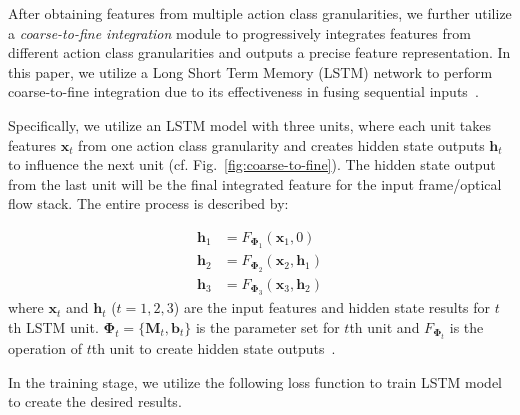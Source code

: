 \documentclass[letterpaper]{article}
\begin{document}
After obtaining features from multiple action class granularities, we further utilize a \emph{coarse-to-fine integration} module to progressively integrates features from different action class granularities and outputs a precise feature representation. In this paper, we utilize a Long Short Term Memory (LSTM) network to perform coarse-to-fine integration due to its effectiveness in fusing sequential inputs~\cite{LSTM,LSTM2}.



Specifically, we utilize an LSTM model with three units, where each unit takes features $\mathbf{x}_{t}$ from one action class granularity and creates hidden state outputs $\mathbf{h}_{t}$ to influence the next unit (cf. Fig.~\ref{fig:coarse-to-fine}). The hidden state output from the last unit will be the final integrated feature for the input frame/optical flow stack. The entire process is described by: %

\begin{equation}
\begin{aligned}
\mathbf{h}_{1}&={F}_{\mathbf{\Phi}_1}\left ( \mathbf{x}_{1}, 0 \right )
\\\mathbf{h}_{2}&={F}_{\mathbf{\Phi}_2}\left ( \mathbf{x}_{2},\mathbf{h}_{1} \right )
\\\mathbf{h}_{3}&={F}_{\mathbf{\Phi}_3}\left ( \mathbf{x}_{3},\mathbf{h}_{2} \right )
\end{aligned}
\label{equation:equ2}
\end{equation}
where $\mathbf{x}_{t}$ and $\mathbf{h}_{t}$ ($t=1,2,3$) are the input features and hidden state results for $t$th LSTM unit. $\mathbf{\Phi}_t=\{\mathbf{M}_t, \mathbf{b}_t\}$ is the parameter set for $t$th unit and ${F}_{\mathbf{\Phi}_t}$ is the operation of $t$th unit to create hidden state outputs~\cite{LSTM}.  %

In the training stage, we utilize the following loss function to train LSTM model to create the desired results.
\end{document}
